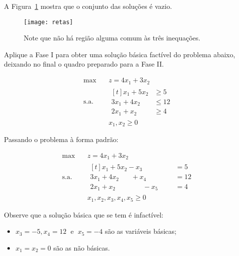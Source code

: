 A Figura~\ref{fig:retas} mostra que o conjunto das soluções é vazio.

\begin{figure}[!h]
  \centering
  \texttt{[image: retas]}
  \caption{Note que não há região alguma comum às três inequações.}
  \label{fig:retas}
\end{figure}

\newpage

\begin{exemplo}
Aplique a Fase I para obter uma solução básica factível do problema abaixo, 
deixando no final o quadro preparado para a Fase II.

\begin{align*}
  \max        \quad & z = 4 x_1 + 3 x_2  \\
  \text{s.a.} \quad & 
                      \begin{aligned}[t]
                          x_1 + 5 x_2 &\geq 5  \\
                        3 x_1 + 4 x_2 &\leq 12 \\
                        2 x_1 +   x_2 &\geq 4
                      \end{aligned}\\
                    & x_1, x_2 \geq 0
\end{align*}
\end{exemplo}

Passando o problema à forma padrão:

\begin{align*}
  \max        \quad & z = 4 x_1 + 3 x_2 \\
  \text{s.a.} \quad & 
                      \begin{aligned}[t]
                          x_1 + 5 x_2 - x_3 \phantom{+ x_4 - x_5}           &= 5  \\
                        3 x_1 + 4 x_2 \phantom{- x_3} + x_4 \phantom{- x_5} &= 12 \\
                        2 x_1 +   x_2 \phantom{- x_3 + x_4} - x_5           &= 4
                      \end{aligned}\\
                    & x_1, x_2, x_3, x_4, x_5 \geq 0
\end{align*}

Observe que a solução básica que se tem é infactível:
\begin{itemize}
  \item $ x_3 = -5, x_4 = 12 \;\text{ e }\; x_5 = -4 $ são as variáveis básicas;
  \item $ x_1 = x_2 = 0 $ são as não básicas.
\end{itemize}


